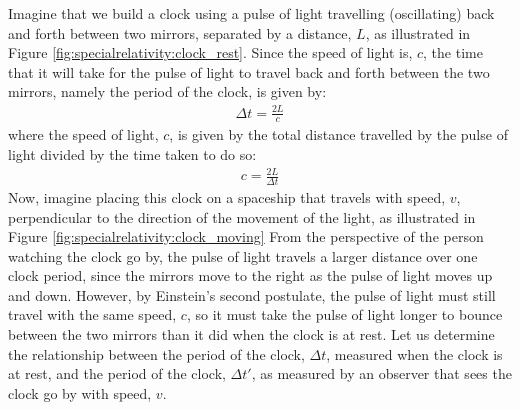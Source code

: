 Imagine that we build a clock using a pulse of light travelling (oscillating) back and forth between two mirrors, separated by a distance, $L$, as illustrated in Figure \ref{fig:specialrelativity:clock_rest}.
Since the speed of light is, $c$, the time that it will take for the pulse of light to travel back and forth between the two mirrors, namely the period of the clock, is given by:
\begin{align*}
\Delta t = \frac{2L}{c}
\end{align*}
where the speed of light, $c$, is given by the total distance travelled by the pulse of light divided by the time taken to do so:
\begin{align*}
c=\frac{2L}{\Delta t}
\end{align*}
Now, imagine placing this clock on a spaceship that travels with speed, $v$, perpendicular to the direction of the movement of the light, as illustrated in Figure \ref{fig:specialrelativity:clock_moving}
From the perspective of the person watching the clock go by, the pulse of light travels a larger distance over one clock period, since the mirrors move to the right as the pulse of light moves up and down. However, by Einstein's second postulate, the pulse of light must still travel with the same speed, $c$, so it must take the pulse of light longer to bounce between the two mirrors than it did when the clock is at rest. Let us determine the relationship between the period of the clock, $\Delta t$, measured when the clock is at rest, and the period of the clock, $\Delta t'$, as measured by an observer that sees the clock go by with speed, $v$. 

